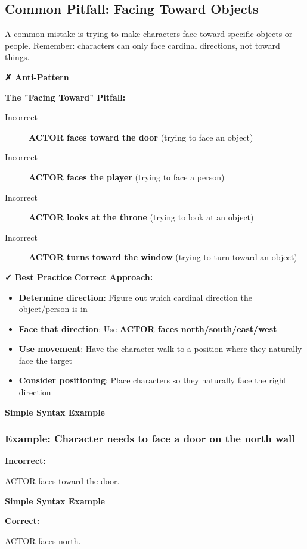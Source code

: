 \documentclass[11pt,letterpaper,oldstylefigures]{memoir}
\newcommand{\stagedir}[1]{#1\par\vspace{1\baselineskip}}
\newenvironment{FountainExample}
  {\begingroup
  \ttfamily\small
   \setlength{\parindent}{0pt}
  \setlength{\parskip}{0.5em}
  \allowdisplaybreaks
  \setlength{\displaywidowpenalty}{0}
  \setlength{\widowpenalty}{0}
  \setlength{\clubpenalty}{0}
  \setlength{\interlinepenalty}{0}
}
  {\endgroup}
\newenvironment{AntiPattern}
{\begingroup
\small
\setlength{\parindent}{0pt}
\setlength{\parskip}{0.5em}
\allowdisplaybreaks
\setlength{\displaywidowpenalty}{0}
\setlength{\widowpenalty}{0}
\setlength{\clubpenalty}{0}
\setlength{\interlinepenalty}{0}
\begin{tcolorbox}[
    colback=red!5,
    colframe=red!75!black,
    boxrule=0.5pt,
    arc=2pt,
    left=0.5em,
    right=0.5em,
    top=0.25em,
    bottom=0.25em
]
\textbf{✗ Anti-Pattern}
\end{tcolorbox}\par
}
{\endgroup}
\newenvironment{SimpleExample}
{\begingroup
\small
\setlength{\parindent}{0pt}
\setlength{\parskip}{0.5em}
\allowdisplaybreaks
\setlength{\displaywidowpenalty}{0}
\setlength{\widowpenalty}{0}
\setlength{\clubpenalty}{0}
\setlength{\interlinepenalty}{0}
\begin{tcolorbox}[
    colback=blue!5,
    colframe=blue!75!black,
    boxrule=0.5pt,
    arc=2pt,
    left=0.5em,
    right=0.5em,
    top=0.25em,
    bottom=0.25em
]
\textbf{Simple Syntax Example}
\end{tcolorbox}\par
}
{\endgroup}
\newcommand{\fountain}[1]{\textbf{#1}}
\begin{document}
\subsection{Common Pitfall: Facing Toward Objects}

A common mistake is trying to make characters face toward specific objects or people. Remember: characters can only face cardinal directions, not toward things.

\begin{AntiPattern}
\textbf{The "Facing Toward" Pitfall:}
\begin{description}
\item[Incorrect] \fountain{ACTOR faces toward the door} (trying to face an object)
\item[Incorrect] \fountain{ACTOR faces the player} (trying to face a person)
\item[Incorrect] \fountain{ACTOR looks at the throne} (trying to look at an object)
\item[Incorrect] \fountain{ACTOR turns toward the window} (trying to turn toward an object)
\end{description}
\end{AntiPattern}

\textbf{✓ Best Practice}
\textbf{Correct Approach:}
\begin{itemize}
\item \textbf{Determine direction}: Figure out which cardinal direction the object/person is in
\item \textbf{Face that direction}: Use \fountain{ACTOR faces north/south/east/west}
\item \textbf{Use movement}: Have the character walk to a position where they naturally face the target
\item \textbf{Consider positioning}: Place characters so they naturally face the right direction
\end{itemize}


\begin{SimpleExample}
\subsubsection{Example: Character needs to face a door on the north wall}
\textbf{Incorrect:}
\begin{FountainExample}
\stagedir{ACTOR faces toward the door.}
\end{FountainExample}
\end{SimpleExample}

\begin{SimpleExample}
\textbf{Correct:}
\begin{FountainExample}
\stagedir{ACTOR faces north.}
\end{FountainExample}
\end{SimpleExample}
\end{document}

